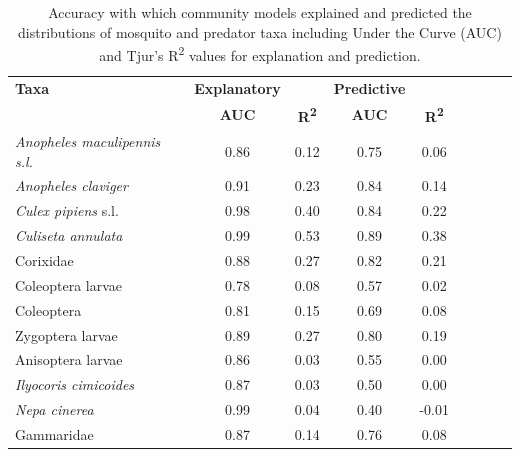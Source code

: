 \documentclass[lineno,sn-basic]{sn-jnl}%
\begin{document}
\begin{table}[htbp]
    \centering
    \caption{Accuracy with which community models explained and predicted the distributions of mosquito and predator taxa including Under the Curve (AUC) and Tjur's R\textsuperscript{2} values for explanation and prediction.} \label{tab:accuracy}
    \begin{tabular}{lcccccccc}
        \toprule
        \textbf{Taxa} & \textbf{Explanatory} & & \textbf{Predictive}  \\
        \cmidrule(lr){2-5}
        &  \textbf{AUC} & \textbf{R\textsuperscript{2}} & \textbf{AUC} & \textbf{R\textsuperscript{2}} \\
        \midrule
        \textit{Anopheles maculipennis s.l.} & 0.86 & 0.12 & 0.75 & 0.06 \\
        \textit{Anopheles claviger} & 0.91 & 0.23 & 0.84 & 0.14 \\
        \textit{Culex pipiens} s.l. & 0.98 & 0.40 & 0.84 & 0.22 \\
        \textit{Culiseta annulata} & 0.99 & 0.53 & 0.89 & 0.38 \\
        Corixidae & 0.88 & 0.27 & 0.82 & 0.21 \\
        Coleoptera larvae & 0.78 & 0.08 & 0.57 & 0.02 \\
        Coleoptera & 0.81 & 0.15 & 0.69 & 0.08 \\
        Zygoptera larvae & 0.89 & 0.27 & 0.80 & 0.19 \\
        Anisoptera larvae & 0.86 & 0.03 & 0.55 & 0.00 \\
        \textit{Ilyocoris cimicoides} & 0.87 & 0.03 & 0.50 & 0.00 \\
        \textit{Nepa cinerea} & 0.99 & 0.04 & 0.40 & -0.01 \\
        Gammaridae & 0.87 & 0.14 & 0.76 & 0.08 \\
        \bottomrule
    \end{tabular}
\end{table}
\end{document}
